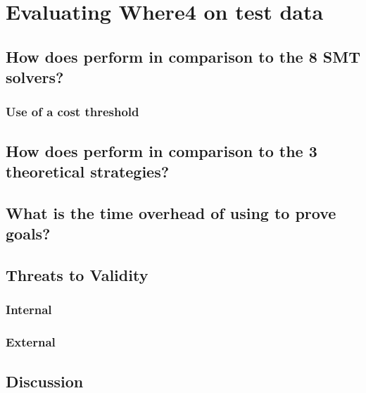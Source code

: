 \chapter{Evaluating Where4 on test data}%

\label{Evaluation} %


\section{How does \where perform in comparison to the 8 SMT solvers?}
\subsection{Use of a cost threshold}

\section{How does \where perform in comparison to the 3 theoretical strategies?}

\section{What is the time overhead of using \where to prove \why goals?}

\section{Threats to Validity}
\subsection{Internal}
\subsection{External}

\section{Discussion}